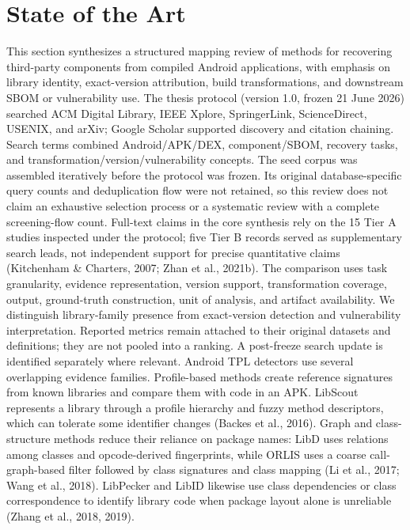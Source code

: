 \documentclass[10pt,twocolumn]{article}
\begin{document}
\section{State of the Art}
This section synthesizes a structured mapping review of methods for recovering third-party components from compiled Android applications, with emphasis on library identity, exact-version attribution, build transformations, and downstream SBOM or vulnerability use. The thesis protocol (version 1.0, frozen 21 June 2026) searched ACM Digital Library, IEEE Xplore, SpringerLink, ScienceDirect, USENIX, and arXiv; Google Scholar supported discovery and citation chaining. Search terms combined Android/APK/DEX, component/SBOM, recovery tasks, and transformation/version/vulnerability concepts. The seed corpus was assembled iteratively before the protocol was frozen. Its original database-specific query counts and deduplication flow were not retained, so this review does not claim an exhaustive selection process or a systematic review with a complete screening-flow count. Full-text claims in the core synthesis rely on the 15 Tier A studies inspected under the protocol; five Tier B records served as supplementary search leads, not independent support for precise quantitative claims (Kitchenham \& Charters, 2007; Zhan et al., 2021b).
The comparison uses task granularity, evidence representation, version support, transformation coverage, output, ground-truth construction, unit of analysis, and artifact availability. We distinguish library-family presence from exact-version detection and vulnerability interpretation. Reported metrics remain attached to their original datasets and definitions; they are not pooled into a ranking. A post-freeze search update is identified separately where relevant.
Android TPL detectors use several overlapping evidence families. Profile-based methods create reference signatures from known libraries and compare them with code in an APK. LibScout represents a library through a profile hierarchy and fuzzy method descriptors, which can tolerate some identifier changes (Backes et al., 2016). Graph and class-structure methods reduce their reliance on package names: LibD uses relations among classes and opcode-derived fingerprints, while ORLIS uses a coarse call-graph-based filter followed by class signatures and class mapping (Li et al., 2017; Wang et al., 2018). LibPecker and LibID likewise use class dependencies or class correspondence to identify library code when package layout alone is unreliable (Zhang et al., 2018, 2019).
\end{document}

